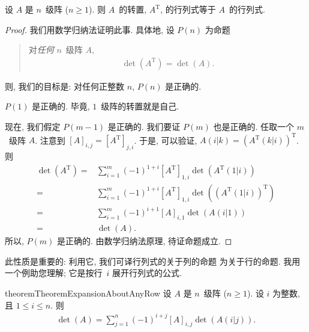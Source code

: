 \begin{theorem}
    设 \(A\) 是 \(n\)~级阵 (\(n \geq 1\)).
    则 \(A\)~的转置, \(A^{\mathrm{T}}\),
    的行列式等于 \(A\)~的行列式.
\end{theorem}

\begin{proof}
    我们用数学归纳法证明此事.
    具体地, 设 \(P(n)\) 为命题
    \begin{quotation}
        对\emph{任何} \(n\)~级阵 \(A\),
        \begin{align*}
            \det {(A^{\mathrm{T}})} = \det {(A)}.
        \end{align*}
    \end{quotation}
    则, 我们的目标是:
    对任何正整数 \(n\), \(P(n)\) 是正确的.

    \(P(1)\) 是正确的.
    毕竟, \(1\)~级阵的转置就是自己.

    现在, 我们假定 \(P(m-1)\) 是正确的.
    我们要证 \(P(m)\) 也是正确的.
    任取一个 \(m\)~级阵 \(A\).
    注意到 \([A]_{i,j} = [A^{\mathrm{T}}]_{j,i}\).
    于是, 可以验证,
    \(A(i|k) = (A^{\mathrm{T}}(k|i))^{\mathrm{T}}\).
    则
    \begin{align*}
        \det {(A^{\mathrm{T}})}
        = {} & \sum_{i = 1}^{m} {
        (-1)^{1+i} [A^{\mathrm{T}}]_{1,i}
        \det {(A^{\mathrm{T}}(1|i))}
        }
        \\
        = {} & \sum_{i = 1}^{m} {
        (-1)^{1+i} [A^{\mathrm{T}}]_{1,i}
        \det {((A^{\mathrm{T}}(1|i))^{\mathrm{T}})}
        }
        \\
        = {} & \sum_{i = 1}^{m} {
        (-1)^{i+1} [A]_{i,1}
        \det {(A(i|1))}
        }
        \\
        = {} & \det {(A)}.
    \end{align*}
    所以, \(P(m)\) 是正确的.
    由数学归纳法原理, 待证命题成立.
\end{proof}

此性质是重要的:
利用它,
我们可译行列式的关于列的命题%
为关于行的命题.
我用一个例助您理解;
它是按行~\(i\) 展开行列式的公式.

\begin{restatable}[]{theorem}{TheoremExpansionAboutAnyRow}
    设 \(A\) 是 \(n\)~级阵 (\(n \geq 1\)).
    设 \(i\) 为整数, 且 \(1 \leq i \leq n\).
    则
    \begin{align*}
        \det {(A)} = \sum_{j = 1}^{n}
        {(-1)^{i+j} [A]_{i,j} \det {(A(i|j))}}.
    \end{align*}
\end{restatable}

